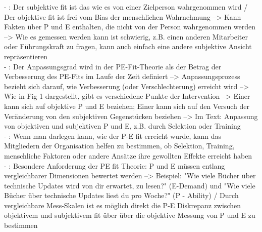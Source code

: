 - \cite[S. 4]{caplan:1987}: Der subjektive fit ist das wie es von einer Zielperson wahrgenommen wird / Der objektive fit ist frei vom Bias der menschlichen Wahrnehmung --> Kann Fakten über P und E enthalten, die nicht von der Person wahrgenommen werden --> Wie es gemessen werden kann ist schwierig, z.B. einen anderen Mitarbeiter oder Führungskraft zu fragen, kann auch einfach eine andere subjektive Ansicht repräsentieren \\
- \cite[S. 4]{caplan:1987}: Der Anpassungsgrad wird in der PE-Fit-Theorie als der Betrag der Verbesserung des PE-Fits im Laufe der Zeit definiert --> Anpassungsprozess bezieht sich darauf, wie Verbesserung (oder Verschlechterung) erreicht wird --> Wie in Fig 1 dargestellt, gibt es verschiedene Punkte der Intervention --> Einer kann sich auf objektive P und E beziehen; Einer kann sich auf den Versuch der Veränderung von den subjektiven Gegenstücken beziehen --> Im Text: Anpassung von objektiven und subjektiven P und E, z.B. durch Selektion oder Training \\
- \cite[S. 4]{caplan:1987}: Wenn man darlegen kann, wie der P-E fit erreicht wurde, kann das Mitgliedern der Organisation helfen zu bestimmen, ob Selektion, Training, menschliche Faktoren oder andere Ansätze ihre gewollten Effekte erreicht haben\\
- \cite[S. 5]{caplan:1987}: Besondere Anforderung der PE fit Theorie: P und E müssen entlang vergleichbarer Dimensionen bewertet werden --> Beispiel: "Wie viele Bücher über technische Updates wird von dir erwartet, zu lesen?" (E-Demand) und "Wie viele Bücher über technische Updates liest du pro Woche?" (P - Ability) / Durch vergleichbare Mess-Skalen ist es möglich direkt die P-E Diskrepanz zwischen objektivem und subjektivem fit über über die objektive Messung von P und E zu bestimmen \\
